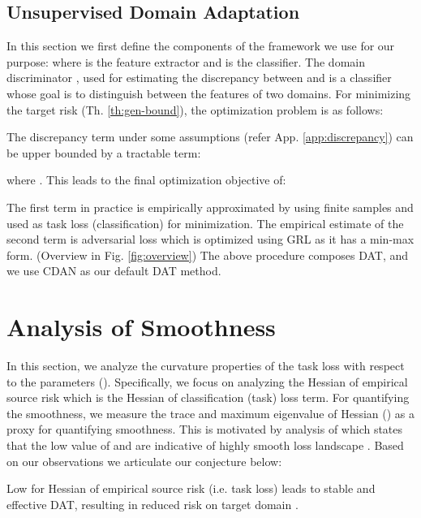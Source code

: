 \documentclass[table,dvipsnames]{article}
\theoremstyle{plain}
\theoremstyle{definition}
\theoremstyle{remark}
\begin{document}
\subsection{Unsupervised Domain Adaptation}
In this section we first define the components of the framework we use for our purpose:  where  is the feature extractor  and  is the classifier. The domain discriminator , used for estimating the discrepancy between  and  is a classifier whose goal is to distinguish between the features of two domains. For minimizing the target risk (Th. \ref{th:gen-bound}), the optimization problem is as follows:

The discrepancy term under some assumptions (refer App. \ref{app:discrepancy}) can be upper bounded by a tractable term:

where 
.
This leads to the final optimization objective of:

The first term in practice is empirically approximated by using finite samples  and used as {task} loss (classification) for minimization. The empirical estimate of the second term is adversarial loss which is optimized using GRL as it has a min-max form. (Overview in Fig. \ref{fig:overview}) The above procedure composes DAT, and we use CDAN \citep{long2018conditional} as our default DAT method.



\section{Analysis of Smoothness} \label{smoothness}
In this section, we analyze the curvature properties of the task loss with respect to the parameters (). Specifically, we focus on analyzing the Hessian of empirical source risk  which is the Hessian of classification ({task}) loss term. For quantifying the smoothness, we measure the trace  and maximum eigenvalue of Hessian () as a proxy for quantifying smoothness. 
This is motivated by analysis of 
which states that the low value of  and  are indicative of highly smooth loss landscape \citep{Jastrzebski2020The}. Based on our observations we articulate our conjecture below: 
\begin{conjecture}
  Low  for Hessian  of empirical source risk (i.e. task loss)  leads to stable and effective DAT, resulting in reduced risk on target domain  .
  
\end{conjecture}
\end{document}
